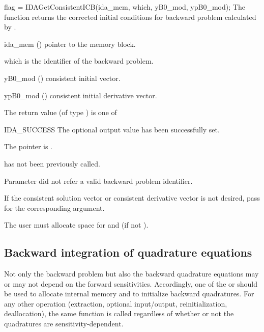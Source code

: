 {
  flag = IDAGetConsistentICB(ida\_mem, which, yB0\_mod, ypB0\_mod);
}
{
  The function  returns the corrected initial conditions
  for backward problem calculated by .
}
{
  \begin{args}
  \item[ida\_mem] ()
    pointer to the {\idas} memory block.
  \item[which]
    is the identifier of the backward problem.
  \item[yB0\_mod] ()
    consistent initial vector.
  \item[ypB0\_mod] ()
    consistent initial derivative vector.
  \end{args}
}
{
  The return value  (of type ) is one of
  \begin{args}
  \item[IDA\_SUCCESS] 
    The optional output value has been successfully set.
  \item[\Id{IDA\_MEM\_NULL}]
    The  pointer is .
  \item[\Id{IDA\_NO\_ADJ}]
     has not been previously called.
  \item[\Id{IDA\_ILL\_INPUT}]
    Parameter  did not refer a valid backward problem identifier.
  \end{args}
}
{
  If the consistent solution vector or consistent derivative vector
  is not desired, pass  for the corresponding argument.

  {\warn} The user must allocate space for  and 
  (if not ).
}

\subsection{Backward integration of quadrature equations}

Not only the backward problem but also the backward quadrature equations 
may or may not depend on the forward sensitivities. Accordingly, one of the 
 or  should be used to allocate internal 
memory and to initialize backward quadratures.  For any other operation
(extraction, optional input/output, reinitialization, deallocation), the
same function is called regardless of whether or not the quadratures are
sensitivity-dependent.

